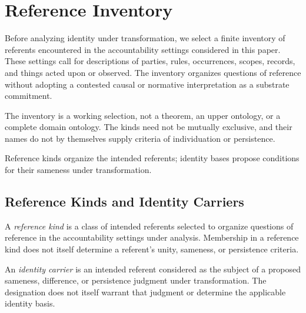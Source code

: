 
\section{Reference Inventory}
\label{sec:inventory}

Before analyzing identity under transformation, we select a finite
inventory of referents encountered in the accountability settings considered
in this paper.
These settings call for descriptions of parties, rules,
occurrences, scopes, records, and things acted upon or observed.
The inventory organizes questions of reference without adopting a
contested causal or normative interpretation as a substrate commitment.

The inventory is a working selection, not a theorem, an upper ontology,
or a complete domain ontology.
The kinds need not be mutually exclusive, and their names do not by
themselves supply criteria of individuation or persistence.

Reference kinds organize the intended referents; identity bases propose
conditions for their sameness under transformation.


\subsection{Reference Kinds and Identity Carriers}
\label{subsec:reference_kinds_identity_carriers}

\begin{definition}
  \label{se200.def.ReferenceKind}
  A \emph{reference kind} is a class of intended referents selected to
  organize questions of reference in the accountability settings under
  analysis.
  Membership in a reference kind does not itself determine
  a referent's unity, sameness, or persistence criteria.
\end{definition}

\begin{definition}
  \label{se200.def.IdentityCarrier}
  An \emph{identity carrier} is an intended referent considered as the
  subject of a proposed sameness, difference, or persistence judgment
  under transformation.
  The designation does not itself warrant that
  judgment or determine the applicable identity basis.
\end{definition}


